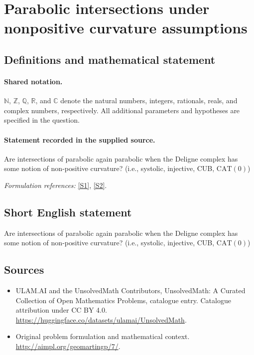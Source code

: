 \documentclass[11pt]{article}
\newcommand{\sref}[2]{\hyperlink{source:#1:#2}{[S#2]}}
\begin{document}
\section{Parabolic intersections under nonpositive curvature assumptions}\label{statement}

\subsection{Definitions and mathematical statement}

\paragraph{Shared notation.}$\mathbb N$, $\mathbb Z$, $\mathbb Q$, $\mathbb R$, and $\mathbb C$ denote the natural numbers, integers, rationals, reals, and complex numbers, respectively. All additional parameters and hypotheses are specified in the question.


\paragraph{Statement recorded in the supplied source.}
Are intersections of parabolic again parabolic when the Deligne complex has some notion of non-positive curvature? (i.e., systolic, injective, CUB, $\mathrm{CAT}(0)$)
\par\smallskip\textit{Formulation references:} \sref{statement}{1}, \sref{statement}{2}.
\subsection{Short English statement}
Are intersections of parabolic again parabolic when the Deligne complex has some notion of non-positive curvature? (i.e., systolic, injective, CUB, $\mathrm{CAT}(0)$)
\subsection{Sources}
\begin{itemize}
\item[\hypertarget{source:statement:1}{S1}] ULAM.AI and the UnsolvedMath Contributors, UnsolvedMath: A Curated Collection of Open Mathematics Problems, catalogue entry. Catalogue attribution under CC BY 4.0.
\url{https://huggingface.co/datasets/ulamai/UnsolvedMath}.
\item[\hypertarget{source:statement:2}{S2}] Original problem formulation and mathematical context.
\url{http://aimpl.org/geomartingp/7/}.
\end{itemize}
\label{end:statement}
\end{document}
